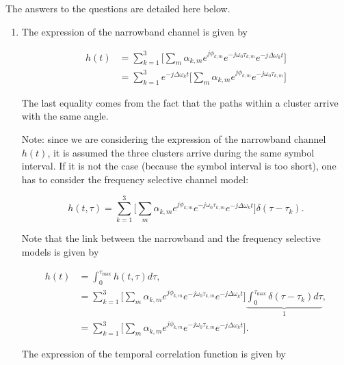 \documentclass [a4paper, 11pt] {article}
\begin{document}
    \begin{solution}
        The answers to the questions are detailed here below.


        \begin{enumerate}
        \item The expression of the narrowband channel is given by

        \begin{align}
         h(t) &=  \sum_{k=1}^{3} \Big[ \sum_m \alpha_{k,m} e^{j\phi_{k,m}}e^{-j\omega_0 \tau_{k,m}}e^{-j\Delta \omega_{k} t} \Big] \\
         & = \sum_{k=1}^{3} e^{-j\Delta \omega_{k} t} \Big[ \sum_m \alpha_{k,m} e^{j\phi_{k,m}} e^{-j\omega_0 \tau_{k,m}}  \Big]
        \end{align}

        The last equality comes from the fact that the paths within a cluster arrive with the same angle.

        Note: since we are considering the expression of the narrowband channel $h(t)$, it is assumed the three clusters arrive during the same symbol interval. If it is not the case (because the symbol interval is too short), one has to consider the frequency selective channel model:

        \begin{equation} h(t,\tau) =  \sum_{k=1}^{3} \Big[ \sum_m \alpha_{k,m} e^{j\phi_{k,m}}e^{-j\omega_0 \tau_{k,m}}e^{-j\Delta \omega_{k} t}\Big] \delta(\tau-\tau_k).
        \end{equation}

        Note that the link between the narrowband and the frequency selective models is given by

        \begin{align}
            h(t) &= \int_{0}^{\tau_{\text{max}}} h(t,\tau)d\tau, \\
             &= \sum_{k=1}^{3} \Big[ \sum_m \alpha_{k,m} e^{j\phi_{k,m}}e^{-j\omega_0 \tau_{k,m}}e^{-j\Delta \omega_{k} t}\Big] \underbrace{\int_{0}^{\tau_{\text{max}}} \delta(\tau-\tau_k)d\tau}_{1}, \\
             &= \sum_{k=1}^{3} \Big[ \sum_m \alpha_{k,m} e^{j\phi_{k,m}}e^{-j\omega_0 \tau_{k,m}}e^{-j\Delta \omega_{k} t}\Big].
        \end{align}

        The expression of the temporal correlation function is given by


\end{enumerate}
\end{solution}
\end{document}
